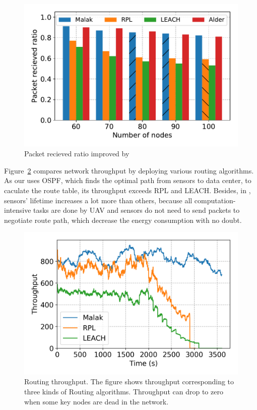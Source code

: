 \begin{figure}[htbp]
	\centering
	\includegraphics[width=.95\columnwidth]{Figure/packet_loss_ratio_with_size}
	\vspace{-0.1in}
	\caption{Packet recieved ratio improved by {\sdn}}
	\label{fig:packet_loss_ratio_with_size}
\end{figure}

Figure~\ref{fig:throughput} compares network throughput by deploying various
routing algorithms. As our {\sdn} uses OSPF, which finds the optimal path from
sensors to data center, to caculate the route table, its throughput exceeds RPL
and LEACH. Besides, in {\sdn}, sensors' lifetime increases a lot more than
others, because all computation-intensive tasks are done by UAV and sensors do
not need to send packets to negotiate route path, which decrease the energy
consumption with no doubt.

\begin{figure}[htbp]
	\centering
	\includegraphics[width=.95\columnwidth]{Figure/throughput}
	\vspace{-0.1in}
	\caption{Routing throughput.
		\textnormal{
			The figure shows throughput corresponding to three kinds of Routing
			algorithms. Throughput can drop to zero when some key nodes are dead
			in the network.
		}}
	\label{fig:throughput}
\end{figure}

